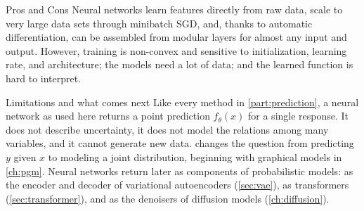 \begin{notebox}{Pros and Cons}
Neural networks learn features directly from raw data, scale to very large data sets through minibatch SGD, and, thanks to automatic differentiation, can be assembled from modular layers for almost any input and output. However, training is non-convex and sensitive to initialization, learning rate, and architecture; the models need a lot of data; and the learned function is hard to interpret.
\end{notebox}

\begin{notebox}{Limitations and what comes next}
Like every method in \cref{part:prediction}, a neural network as used here returns a point prediction $f_\theta(x)$ for a single response. It does not describe uncertainty, it does not model the relations among many variables, and it cannot generate new data.  changes the question from predicting $y$ given $x$ to modeling a joint distribution, beginning with graphical models in \cref{ch:pgm}. Neural networks return later as components of probabilistic models: as the encoder and decoder of variational autoencoders (\cref{sec:vae}), as transformers (\cref{sec:transformer}), and as the denoisers of diffusion models (\cref{ch:diffusion}).
\end{notebox}
